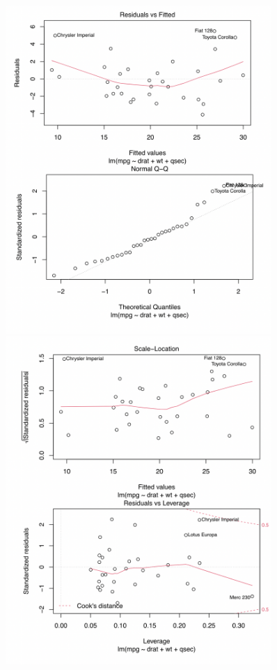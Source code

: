 \documentclass[12 pt, a4paper]{article}
\begin{document}
\begin{figure}[h]
    \centering
    \begin{minipage}{0.45\textwidth}
        \centering
        \includegraphics[width=0.9\textwidth]{Graph1} %
    \end{minipage}\hfill
    \begin{minipage}{0.45\textwidth}
        \centering
        \includegraphics[width=0.9\textwidth]{Graph2} %
    \end{minipage}
\end{figure}
\end{document}
